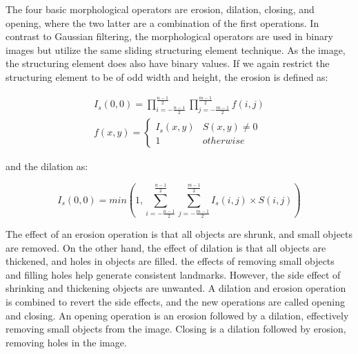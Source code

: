 The four basic morphological operators are erosion, dilation, closing, and opening, where the two latter are a combination of the first operations. In contrast to Gaussian filtering, the morphological operators are used in binary images but utilize the same sliding structuring element technique. As the image, the structuring element does also have binary values. If we again restrict the structuring element to be of odd width and height, the erosion is defined as: 

\begin{equation}
    \begin{split}
        I_s(0,0) = \prod_{i = -\frac{n-1}{2}}^\frac{n-1}{2} \prod_{j = -\frac{m-1}{2}}^\frac{m-1}{2} f(i,j) \\
        f(x,y) = 
        \begin{cases}
        I_s(x,y) & S(x,y) \neq 0 \\
        1 & otherwise
        \end{cases}
    \end{split}
    \label{eq:erosion}
\end{equation}

and the dilation as:

\begin{equation}
    I_s(0,0) = min(1, \sum_{i = -\frac{n-1}{2}}^\frac{n-1}{2} \sum_{j = -\frac{m-1}{2}}^\frac{m-1}{2} I_s(i,j) \times S(i,j))
    \label{eq:dialation}
\end{equation}

The effect of an erosion operation is that all objects are shrunk, and small objects are removed. On the other hand, the effect of dilation is that all objects are thickened, and holes in objects are filled. the effects of removing small objects and filling holes help generate consistent landmarks. However, the side effect of shrinking and thickening objects are unwanted. A dilation and erosion operation is combined to revert the side effects, and the new operations are called opening and closing. An opening operation is an erosion followed by a dilation, effectively removing small objects from the image. Closing is a dilation followed by erosion, removing holes in the image. 





